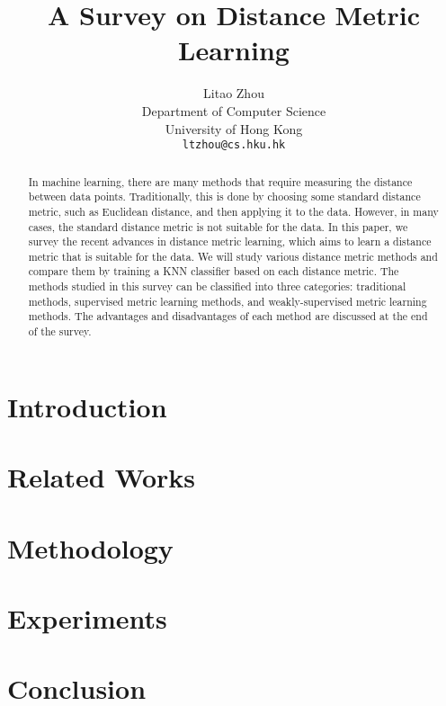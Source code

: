 \documentclass{article}
\title{A Survey on Distance Metric Learning}
\author{%
  Litao Zhou \\
  Department of Computer Science\\
  University of Hong Kong\\
  \texttt{ltzhou@cs.hku.hk} \\
}
\begin{document}
\maketitle


\begin{abstract}
  In machine learning, there are many methods that require measuring the distance between data points. Traditionally, this is done by choosing some standard distance metric, such as Euclidean distance, and then applying it to the data. However, in many cases, the standard distance metric is not suitable for the data. In this paper, we survey the recent advances in distance metric learning, which aims to learn a distance metric that is suitable for the data.
  We will study various distance metric methods and compare them by training a KNN classifier based on each distance metric. The methods studied in this survey can be classified into three categories: traditional methods, supervised metric learning methods, and weakly-supervised metric learning methods. The advantages and disadvantages of each method are discussed at the end of the survey.
\end{abstract}

\section{Introduction}



\section{Related Works}
\label{sec:related}



\section{Methodology}
\label{sec:method}




\section{Experiments}
\label{sec:experiment}




\section{Conclusion}
\label{sec:conclusion}













\appendix
\end{document}

